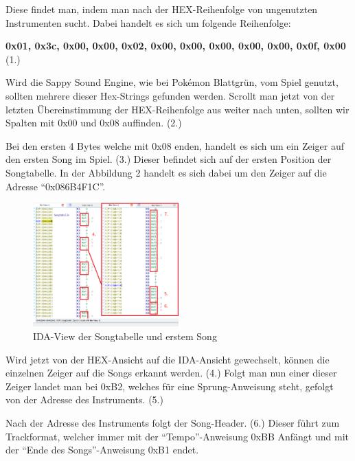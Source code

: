 \documentclass[11pt,a4paper]{scrartcl}
\begin{document}
Diese findet man, indem man nach der HEX-Reihenfolge von ungenutzten Instrumenten sucht. Dabei handelt es sich um folgende Reihenfolge: 

\textbf{0x01, 0x3c, 0x00, 0x00, 0x02, 0x00, 0x00, 0x00, 0x00, 0x00, 0x0f, 0x00} (1.)

Wird die Sappy Sound Engine, wie bei Pok\'{e}mon Blattgr\"{u}n, vom Spiel genutzt, sollten mehrere dieser Hex-Strings gefunden werden.
Scrollt man jetzt von der letzten \"{U}bereinstimmung der HEX-Reihenfolge aus weiter nach unten, sollten wir Spalten mit 0x00 und 0x08 auffinden. (2.)

Bei den ersten 4 Bytes welche mit 0x08 enden, handelt es sich um ein Zeiger auf den ersten Song im Spiel. (3.) Dieser befindet sich auf der ersten Position der Songtabelle. 
In der Abbildung 2 handelt es sich dabei um den Zeiger auf die Adresse "`0x086B4F1C"'.

\vspace{10pt}

\begin{figure}
	\vspace{-10pt}
	\begin{center}
		\includegraphics[width=0.5\textwidth]{SongtabellenHeader}
	\end{center}
	\vspace{-10pt}
	\caption{IDA-View der Songtabelle und erstem Song}
	\label{fig:IDA-view}
	\vspace{-40pt}
\end{figure}


Wird jetzt von der HEX-Ansicht auf die IDA-Ansicht gewechselt, k\"{o}nnen die einzelnen Zeiger auf die Songs erkannt werden. (4.)
Folgt man nun einer dieser Zeiger landet man bei 0xB2, welches f\"{u}r eine Sprung-Anweisung steht, gefolgt von der Adresse des Instruments. (5.)

Nach der Adresse des Instruments folgt der Song-Header. (6.) Dieser f\"{u}hrt zum Trackformat, welcher immer mit der "`Tempo"'-Anweisung 0xBB Anf\"{a}ngt und mit der "`Ende des Songs"'-Anweisung 0xB1 endet. 
\end{document}
